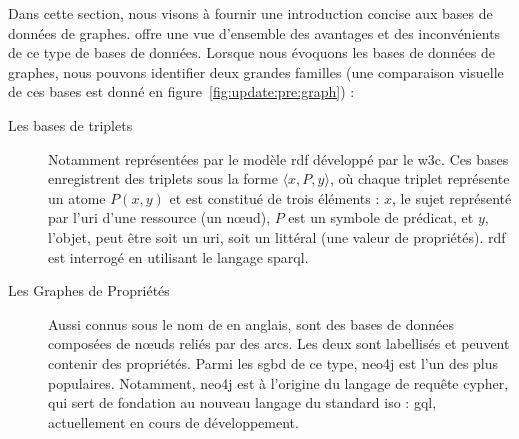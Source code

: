 Dans cette section, nous visons à fournir une introduction concise aux bases de données de graphes.
\cite{pokornyGraphDatabasesTheir2015} offre une vue d'ensemble des avantages et des inconvénients de ce type de bases de données.
Lorsque nous évoquons les bases de données de graphes, nous pouvons identifier deux grandes familles (une comparaison visuelle de ces bases est donné en figure~\ref{fig:update:pre:graph}) :
\begin{description}
    \item[Les bases de triplets] Notamment représentées par le modèle \gls{rdf} développé par le \gls{w3c}.
          Ces bases enregistrent des triplets sous la forme $\langle x, P, y \rangle$, où chaque triplet représente un atome $P(x, y)$ et est constitué de trois éléments : $x$, le sujet représenté par l'\gls{uri} d'une ressource (un nœud), $P$ est un symbole de prédicat, et $y$, l'objet, peut être soit un \gls{uri}, soit un littéral (une valeur de propriétés).
          \acs{rdf} est interrogé en utilisant le langage \gls{sparql}.

    \item[Les Graphes de Propriétés] Aussi connus sous le nom de  en anglais, sont des bases de données composées de nœuds reliés par des arcs. Les deux sont labellisés et peuvent contenir des propriétés.
          Parmi les \gls{sgbd} de ce type, \gls{neo4j} est l'un des plus populaires.
          Notamment, \gls{neo4j} est à l'origine du langage de requête \gls{cypher}, qui sert de fondation au nouveau langage du standard \gls{iso} : \gls{gql}, actuellement en cours de développement.
\end{description}

